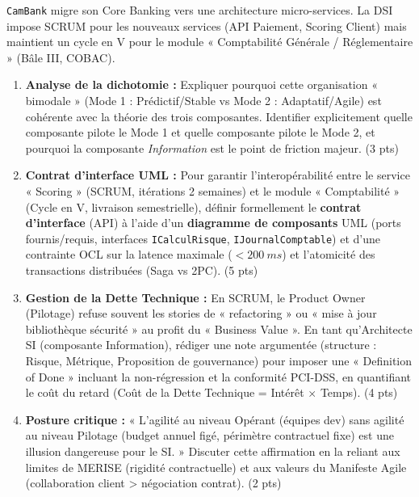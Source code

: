 \documentclass[11pt]{article}
\begin{document}
\begin{exercice}
\texttt{CamBank} migre son Core Banking vers une architecture micro-services. La DSI impose SCRUM pour les nouveaux services (API Paiement, Scoring Client) mais maintient un cycle en V pour le module « Comptabilité Générale / Réglementaire » (Bâle III, COBAC).
\begin{enumerate}
    \item \textbf{Analyse de la dichotomie :} Expliquer pourquoi cette organisation « bimodale » (Mode 1 : Prédictif/Stable vs Mode 2 : Adaptatif/Agile) est cohérente avec la théorie des trois composantes. Identifier explicitement quelle composante pilote le Mode 1 et quelle composante pilote le Mode 2, et pourquoi la composante \textit{Information} est le point de friction majeur. (3 pts)
    \item \textbf{Contrat d'interface UML :} Pour garantir l'interopérabilité entre le service « Scoring » (SCRUM, itérations 2 semaines) et le module « Comptabilité » (Cycle en V, livraison semestrielle), définir formellement le \textbf{contrat d'interface} (API) à l'aide d'un \textbf{diagramme de composants} UML (ports fournis/requis, interfaces \texttt{ICalculRisque}, \texttt{IJournalComptable}) et d'une contrainte OCL sur la latence maximale ($< \SI{200}{ms}$) et l'atomicité des transactions distribuées (Saga vs 2PC). (5 pts)
    \item \textbf{Gestion de la Dette Technique :} En SCRUM, le Product Owner (Pilotage) refuse souvent les stories de « refactoring » ou « mise à jour bibliothèque sécurité » au profit du « Business Value ». En tant qu'Architecte SI (composante Information), rédiger une note argumentée (structure : Risque, Métrique, Proposition de gouvernance) pour imposer une « Definition of Done » incluant la non-régression et la conformité PCI-DSS, en quantifiant le coût du retard (Coût de la Dette Technique = Intérêt $\times$ Temps). (4 pts)
    \item \textbf{Posture critique :} « L'agilité au niveau Opérant (équipes dev) sans agilité au niveau Pilotage (budget annuel figé, périmètre contractuel fixe) est une illusion dangereuse pour le SI. » Discuter cette affirmation en la reliant aux limites de MERISE (rigidité contractuelle) et aux valeurs du Manifeste Agile (collaboration client > négociation contrat). (2 pts)
\end{enumerate}
\end{exercice}
\end{document}
